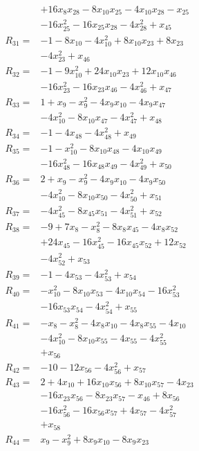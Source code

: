\begin{align*}
&+16x_{8}x_{28} -8x_{10}x_{25} -4x_{10}x_{28} -x_{25}\\
&-16x_{25}^{2} -16x_{25}x_{28} -4x_{28}^{2} +x_{45}\\[3pt]
R_{31}={}&-1 -8x_{10} -4x_{10}^{2} +8x_{10}x_{23} +8x_{23}\\
&-4x_{23}^{2} +x_{46}\\[3pt]
R_{32}={}&-1 -9x_{10}^{2} +24x_{10}x_{23} +12x_{10}x_{46}\\
&-16x_{23}^{2} -16x_{23}x_{46} -4x_{46}^{2} +x_{47}\\[3pt]
R_{33}={}&1 +x_{9} -x_{9}^{2} -4x_{9}x_{10} -4x_{9}x_{47}\\
&-4x_{10}^{2} -8x_{10}x_{47} -4x_{47}^{2} +x_{48}\\[3pt]
R_{34}={}&-1 -4x_{48} -4x_{48}^{2} +x_{49}\\[3pt]
R_{35}={}&-1 -x_{10}^{2} -8x_{10}x_{48} -4x_{10}x_{49}\\
&-16x_{48}^{2} -16x_{48}x_{49} -4x_{49}^{2} +x_{50}\\[3pt]
R_{36}={}&2 +x_{9} -x_{9}^{2} -4x_{9}x_{10} -4x_{9}x_{50}\\
&-4x_{10}^{2} -8x_{10}x_{50} -4x_{50}^{2} +x_{51}\\[3pt]
R_{37}={}&-4x_{45}^{2} -8x_{45}x_{51} -4x_{51}^{2} +x_{52}\\[3pt]
R_{38}={}&-9 +7x_{8} -x_{8}^{2} -8x_{8}x_{45} -4x_{8}x_{52}\\
&+24x_{45} -16x_{45}^{2} -16x_{45}x_{52} +12x_{52}\\
&-4x_{52}^{2} +x_{53}\\[3pt]
R_{39}={}&-1 -4x_{53} -4x_{53}^{2} +x_{54}\\[3pt]
R_{40}={}&-x_{10}^{2} -8x_{10}x_{53} -4x_{10}x_{54} -16x_{53}^{2}\\
&-16x_{53}x_{54} -4x_{54}^{2} +x_{55}\\[3pt]
R_{41}={}&-x_{8} -x_{8}^{2} -4x_{8}x_{10} -4x_{8}x_{55} -4x_{10}\\
&-4x_{10}^{2} -8x_{10}x_{55} -4x_{55} -4x_{55}^{2}\\
&+x_{56}\\[3pt]
R_{42}={}&-10 -12x_{56} -4x_{56}^{2} +x_{57}\\[3pt]
R_{43}={}&2 +4x_{10} +16x_{10}x_{56} +8x_{10}x_{57} -4x_{23}\\
&-16x_{23}x_{56} -8x_{23}x_{57} -x_{46} +8x_{56}\\
&-16x_{56}^{2} -16x_{56}x_{57} +4x_{57} -4x_{57}^{2}\\
&+x_{58}\\[3pt]
R_{44}={}&x_{9} -x_{9}^{2} +8x_{9}x_{10} -8x_{9}x_{23}\\

\end{align*}
